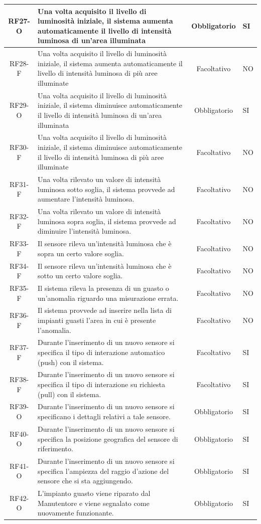 \documentclass[a4paper, 11pt]{article}
\begin{document}
\begin{longtable}{|c|p{7cm}|c|p{4cm}|}
    \hline
    RF27-O & Una volta acquisito il livello di luminosità iniziale, il sistema aumenta automaticamente il livello di intensità luminosa di un'area illuminata & Obbligatorio & SI \\
    \hline
    RF28-F & Una volta acquisito il livello di luminosità iniziale, il sistema aumenta automaticamente il livello di intensità luminosa di più aree illuminate & Facoltativo & NO \\
    \hline
    RF29-O & Una volta acquisito il livello di luminosità iniziale, il sistema diminuisce automaticamente il livello di intensità luminosa di un'area illuminata & Obbligatorio & SI \\
    \hline
    RF30-F & Una volta acquisito il livello di luminosità iniziale, il sistema diminuisce automaticamente il livello di intensità luminosa di più aree illuminate & Facoltativo & NO \\
    \hline
    RF31-F & Una volta rilevato un valore di intensità luminosa sotto soglia, il sistema provvede ad aumentare l'intensità luminosa. & Facoltativo & NO\\
    \hline
    RF32-F & Una volta rilevato un valore di intensità luminosa sopra soglia, il sistema provvede ad diminuire l'intensità luminosa. & Facoltativo & NO\\
    \hline
    RF33-F & Il sensore rileva un'intensità luminosa che è sopra un certo valore soglia. & Facoltativo & NO\\
    \hline
    RF34-F & Il sensore rileva un'intensità luminosa che è sotto un certo valore soglia. & Facoltativo & NO\\
    \hline
    RF35-F & Il sistema rileva la presenza di un guasto o un'anomalia riguardo una misurazione errata. & Facoltativo & NO\\
    \hline
    RF36-F & Il sistema provvede ad inserire nella lista di impianti guasti l'area in cui è presente l'anomalia. & Facoltativo & NO\\    
    \hline
    RF37-F & Durante l'inserimento di un nuovo sensore si specifica il tipo di interazione automatico (push) con il sistema. & Facoltativo & SI\\
    \hline
    RF38-F & Durante l'inserimento di un nuovo sensore si specifica il tipo di interazione su richiesta (pull) con il sistema. & Facoltativo & SI\\
    \hline
    RF39-O & Durante l'inserimento di un nuovo sensore si specificano i dettagli relativi a tale sensore. & Obbligatorio & SI\\
    \hline
    RF40-O & Durante l'inserimento di un nuovo sensore si specifica la posizione geografica del sensore di riferimento. & Obbligatorio & SI\\
    \hline
    RF41-O & Durante l'inserimento di un nuovo sensore si specifica l'ampiezza del raggio d'azione del sensore che si sta aggiungendo. & Obbligatorio & SI\\
    \hline
    RF42-O & L'impianto guasto viene riparato dal Manutentore e viene segnalato come nuovamente funzionante. & Obbligatorio & SI\\
    \hline
\end{longtable}
\end{document}
